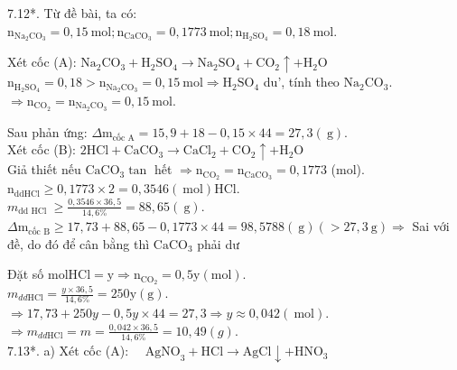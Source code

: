 \documentclass[10pt]{article}
\begin{document}
7.12*. Từ đề bài, ta có: $\mathrm{n}_{\mathrm{Na}_{2} \mathrm{CO}_{3}}=0,15 \mathrm{~mol} ; \mathrm{n}_{\mathrm{CaCO}_{3}}=0,1773 \mathrm{~mol} ; \mathrm{n}_{\mathrm{H}_{2} \mathrm{SO}_{4}}=0,18 \mathrm{~mol}$.

Xét cốc (A): $\mathrm{Na}_{2} \mathrm{CO}_{3}+\mathrm{H}_{2} \mathrm{SO}_{4} \rightarrow \mathrm{Na}_{2} \mathrm{SO}_{4}+\mathrm{CO}_{2} \uparrow+\mathrm{H}_{2} \mathrm{O}$\\
$\mathrm{n}_{\mathrm{H}_{2} \mathrm{SO}_{4}}=0,18>\mathrm{n}_{\mathrm{Na}_{2} \mathrm{CO}_{3}}=0,15 \mathrm{~mol} \Rightarrow \mathrm{H}_{2} \mathrm{SO}_{4}$ du', tính theo $\mathrm{Na}_{2} \mathrm{CO}_{3}$.\\
$\Rightarrow \mathrm{n}_{\mathrm{CO}_{2}}=\mathrm{n}_{\mathrm{Na}_{2} \mathrm{CO}_{3}}=0,15 \mathrm{~mol}$.

Sau phản ứng: $\Delta \mathrm{m}_{\text {cốc } \mathrm{A}}=15,9+18-0,15 \times 44=27,3(\mathrm{~g})$.\\
Xét cốc (B): $2 \mathrm{HCl}+\mathrm{CaCO}_{3} \rightarrow \mathrm{CaCl}_{2}+\mathrm{CO}_{2} \uparrow+\mathrm{H}_{2} \mathrm{O}$\\
Giả thiết nếu $\mathrm{CaCO}_{3} \tan$ hết $\Rightarrow \mathrm{n}_{\mathrm{CO}_{2}}=\mathrm{n}_{\mathrm{CaCO}_{3}}=0,1773$ (mol).\\
$\mathrm{n}_{\mathrm{dd} \mathrm{HCl}} \geq 0,1773 \times 2=0,3546(\mathrm{~mol}) \mathrm{HCl}$.\\
$m_{\text {dd HCl }} \geq \frac{0,3546 \times 36,5}{14,6 \%}=88,65(\mathrm{~g})$.\\
$\Delta \mathrm{m}_{\text {cốc } \mathrm{B}} \geq 17,73+88,65-0,1773 \times 44=98,5788(\mathrm{~g})(>27,3 \mathrm{~g}) \Rightarrow$ Sai với đề, do đó để cân bằng thì $\mathrm{CaCO}_{3}$ phải dư

Đặt số $\mathrm{mol} \mathrm{HCl}=\mathrm{y} \Rightarrow \mathrm{n}_{\mathrm{CO}_{2}}=0,5 \mathrm{y}(\mathrm{mol})$.\\
$m_{d d \mathrm{HCl}}=\frac{y \times 36,5}{14,6 \%}=250 \mathrm{y}(\mathrm{g})$.\\
$\Rightarrow 17,73+250 y-0,5 y \times 44=27,3 \Rightarrow y \approx 0,042(\mathrm{~mol})$.\\
$\Rightarrow m_{d d \mathrm{HCl}}=m=\frac{0,042 \times 36,5}{14,6 \%}=10,49(g)$.\\
7.13*. a) Xét cốc (A): $\quad \mathrm{AgNO}_{3}+\mathrm{HCl} \rightarrow \mathrm{AgCl} \downarrow+\mathrm{HNO}_{3}$
\end{document}
